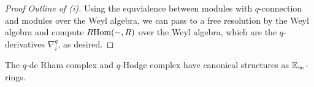 \begin{proof}[Proof Outline of (i)]
    Using the equvialence between modules with $q$-connection and modules over the Weyl algebra, we can pass to a free resolution by the Weyl algebra and compute $R\mathrm{Hom}(-,R)$ over the Weyl algebra, which are the $q$-derivatives $\nabla_{i}^{q}$, as desired. 
\end{proof}
\begin{corollary}
    The $q$-de Rham complex and $q$-Hodge complex have canonical structures as $\mathbb{E}_{\infty}$-rings. 
\end{corollary}